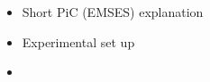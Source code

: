 \begin{itemize}
	\item Short PiC (EMSES) explanation
	\item Experimental set up
	\item 
\end{itemize}
